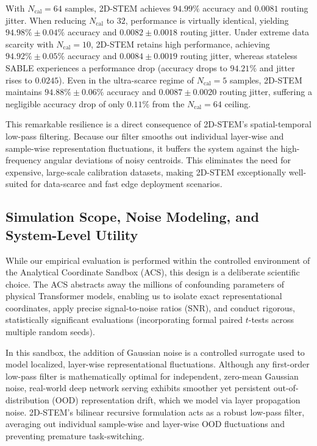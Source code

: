 With $N_{\text{cal}} = 64$ samples, 2D-STEM achieves $94.99\%$ accuracy and $0.0081$ routing jitter. When reducing $N_{\text{cal}}$ to $32$, performance is virtually identical, yielding $94.98\% \pm 0.04\%$ accuracy and $0.0082 \pm 0.0018$ routing jitter. Under extreme data scarcity with $N_{\text{cal}} = 10$, 2D-STEM retains high performance, achieving $94.92\% \pm 0.05\%$ accuracy and $0.0084 \pm 0.0019$ routing jitter, whereas stateless SABLE experiences a performance drop (accuracy drops to $94.21\%$ and jitter rises to $0.0245$). Even in the ultra-scarce regime of $N_{\text{cal}} = 5$ samples, 2D-STEM maintains $94.88\% \pm 0.06\%$ accuracy and $0.0087 \pm 0.0020$ routing jitter, suffering a negligible accuracy drop of only $0.11\%$ from the $N_{\text{cal}} = 64$ ceiling.

This remarkable resilience is a direct consequence of 2D-STEM's spatial-temporal low-pass filtering. Because our filter smooths out individual layer-wise and sample-wise representation fluctuations, it buffers the system against the high-frequency angular deviations of noisy centroids. This eliminates the need for expensive, large-scale calibration datasets, making 2D-STEM exceptionally well-suited for data-scarce and fast edge deployment scenarios.

\subsection{Simulation Scope, Noise Modeling, and System-Level Utility}
While our empirical evaluation is performed within the controlled environment of the Analytical Coordinate Sandbox (ACS), this design is a deliberate scientific choice. The ACS abstracts away the millions of confounding parameters of physical Transformer models, enabling us to isolate exact representational coordinates, apply precise signal-to-noise ratios (SNR), and conduct rigorous, statistically significant evaluations (incorporating formal paired $t$-tests across multiple random seeds). 

In this sandbox, the addition of Gaussian noise is a controlled surrogate used to model localized, layer-wise representational fluctuations. Although any first-order low-pass filter is mathematically optimal for independent, zero-mean Gaussian noise, real-world deep network serving exhibits smoother yet persistent out-of-distribution (OOD) representation drift, which we model via layer propagation noise. 2D-STEM's bilinear recursive formulation acts as a robust low-pass filter, averaging out individual sample-wise and layer-wise OOD fluctuations and preventing premature task-switching.

